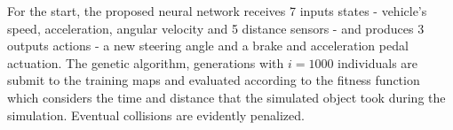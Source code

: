 For the start, the proposed neural network receives 7 inputs states - vehicle's speed, acceleration, angular velocity and 5 distance sensors - and produces 3 outputs actions - a new steering angle and a brake and acceleration pedal actuation. The genetic algorithm, generations with \(i = 1000\) individuals are submit to the training maps and evaluated according to the fitness function which considers the time and distance that the simulated object took during the simulation. Eventual collisions are evidently penalized.











